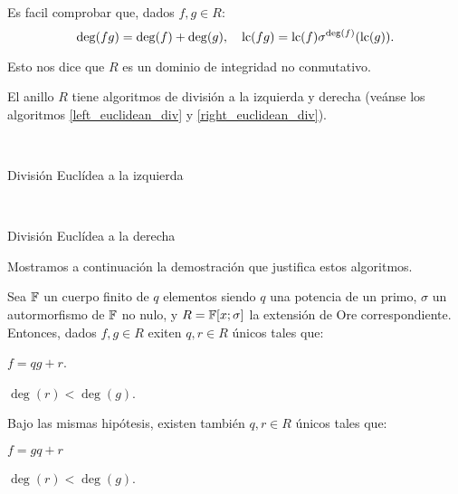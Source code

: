 Es facil comprobar que, dados \(f, g \in R\):
\[
\deg(fg) = \deg(f) + \deg(g), \quad \operatorname{lc}(fg) = \operatorname{lc}(f)\sigma^{\deg(f)}(\operatorname{lc}(g))
.\]

Esto nos dice que \(R\) es un dominio de integridad no conmutativo.

El anillo \(R\) tiene algoritmos de división a la izquierda y derecha (veánse los algoritmos \ref{left_euclidean_div} y \ref{right_euclidean_div}).

\begin{algorithm}[H]
 \label{left_euclidean_div}
  \\
 \caption{División Euclídea a la izquierda}
\end{algorithm}

\begin{algorithm}[H]
 \label{right_euclidean_div}
  \\
 \caption{División Euclídea a la derecha}
\end{algorithm}

Mostramos a continuación la demostración que justifica estos algoritmos.

\begin{theorem}
Sea \(\mathbb{F}\) un cuerpo finito de \(q\) elementos siendo \(q\) una potencia de un primo,  \(\sigma\) un autormorfismo de \(\mathbb{F}\) no nulo, y \(R = \mathbb{F}[x;\sigma]\) la extensión de Ore correspondiente. Entonces, dados \(f, g \in R\) exiten \(q, r \in R\) únicos tales que:
\begin{nlist}
    \item \(f = qg + r\).
    \item \(\deg(r) < \deg(g)\).
\end{nlist}

Bajo las mismas hipótesis, existen también \(q, r \in R\) únicos tales que:
\begin{nlist}
    \item \(f = gq + r\)
    \item \(\deg(r) < \deg(g)\).
\end{nlist}
\end{theorem}

